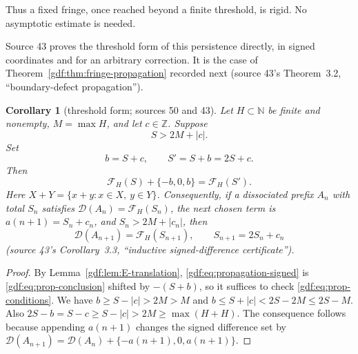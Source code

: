\documentclass[11pt,a4paper]{article}
\numberwithin{equation}{section}
\newtheorem{corollary}[theorem]{Corollary}
\theoremstyle{definition}
\theoremstyle{remark}
\theoremstyle{plain}
\newcommand{\Z}{\mathbb Z}
\newcommand{\N}{\mathbb N}
\newcommand{\cD}{\mathcal D}
\newcommand{\cF}{\mathcal F}
\begin{document}
Thus a fixed fringe, once reached beyond a finite threshold, is rigid.  No
asymptotic estimate is needed.

Source 43 proves the threshold form of this persistence directly, in signed
coordinates and for an arbitrary correction.  It is the case of
Theorem~\ref{gdf:thm:fringe-propagation} recorded next (source 43's
Theorem~3.2, ``boundary-defect propagation'').

\begin{corollary}[threshold form; sources 50 and 43]\label{gdf:cor:threshold}
Let $H\subset\N$ be finite and nonempty, $M=\max H$, and let $c\in\Z$.
Suppose
\begin{equation}\label{gdf:eq:threshold}
 S>2M+|c|.
\end{equation}
Set
\[
 b=S+c,\qquad S'=S+b=2S+c.
\]
Then
\begin{equation}\label{gdf:eq:propagation-signed}
 \cF_H(S)+\{-b,0,b\}=\cF_H(S').
\end{equation}
Here $X+Y=\{x+y:x\in X,\ y\in Y\}$.  Consequently, if a dissociated prefix
$A_n$ with total $S_n$ satisfies $\cD(A_n)=\cF_H(S_n)$, the next chosen term is
$a(n+1)=S_n+c_n$, and $S_n>2M+|c_n|$, then
\begin{equation}\label{gdf:eq:inductive-certificate}
 \cD(A_{n+1})=\cF_H(S_{n+1}),
 \qquad S_{n+1}=2S_n+c_n
\end{equation}
(source 43's Corollary~3.3, ``inductive signed-difference certificate'').
\end{corollary}

\begin{proof}
By Lemma~\ref{gdf:lem:E-translation}, \eqref{gdf:eq:propagation-signed} is
\eqref{gdf:eq:prop-conclusion} shifted by $-(S+b)$, so it suffices to check
\eqref{gdf:eq:prop-conditions}.  We have $b\ge S-|c|>2M>M$ and
$b\le S+|c|<2S-2M\le 2S-M$.  Also $2S-b=S-c\ge S-|c|>2M\ge\max(H+H)$.  The
consequence follows because appending $a(n+1)$ changes the signed difference
set by $\cD(A_{n+1})=\cD(A_n)+\{-a(n+1),0,a(n+1)\}$.
\end{proof}
\end{document}
